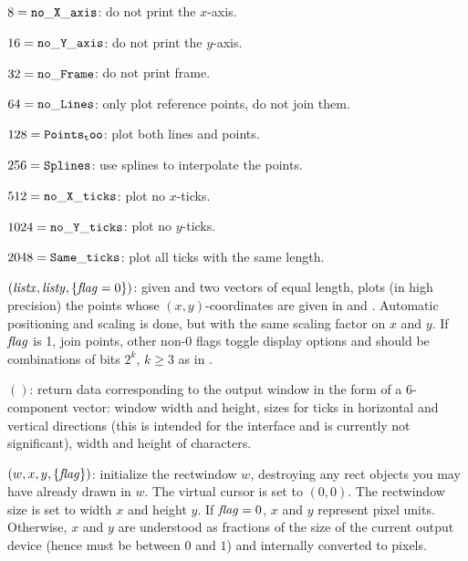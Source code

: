 \item $8 = {\tt no\_X\_axis}$: do not print the $x$-axis.

\item $16 = {\tt no\_Y\_axis}$: do not print the $y$-axis.

\item $32 = {\tt no\_Frame}$: do not print frame.

\item $64 = {\tt no\_Lines}$: only plot reference points, do not join them.

\item $128 = {\tt Points_too}$: plot both lines and points.

\item $256 = {\tt Splines}$: use splines to interpolate the points.

\item $512 = {\tt no\_X\_ticks}$: plot no $x$-ticks.

\item $1024 = {\tt no\_Y\_ticks}$: plot no $y$-ticks.

\item $2048 = {\tt Same\_ticks}$: plot all ticks with the same length.

$(\hbox{\it listx\/},\hbox{\it listy\/},\{\hbox{\it f\kern0pt lag\/}=0\})$: given
 and  two vectors of equal length, plots (in high
precision) the points whose $(x,y)$-coordinates are given in 
and . Automatic positioning and scaling is done, but with the
same scaling factor on $x$ and $y$. If $\hbox{\it f\kern0pt lag\/}$ is 1, join points, other non-0
flags toggle display options and should be combinations of bits $2^k$, $k
\geq 3$ as in .

$()$: return data corresponding to the output window
in the form of a 6-component vector: window width and height, sizes for ticks
in horizontal and vertical directions (this is intended for the 
interface and is currently not significant), width and height of characters.

$(w,x,y,\{\hbox{\it f\kern0pt lag\/}\})$: initialize the rectwindow $w$,
destroying any rect objects you may have already drawn in $w$. The virtual
cursor is set to $(0,0)$. The rectwindow size is set to width $x$ and height
$y$. If $\hbox{\it f\kern0pt lag\/}=0$, $x$ and $y$ represent pixel units. Otherwise, $x$ and $y$
are understood as fractions of the size of the current output device (hence
must be between $0$ and $1$) and internally converted to pixels.

